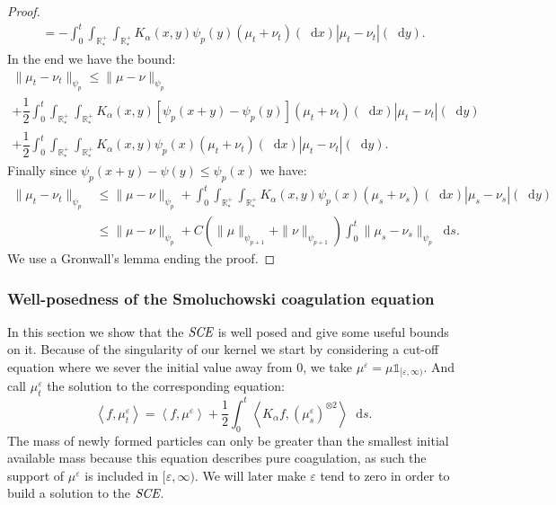 \documentclass[11pt,a4paper]{article}
\newcommand{\RRP}{\mathbb{R}^+_*}
\newcommand{\SCE}{\emph{SCE}}
\newcommand{\brac}[1]{\left\langle#1\right\rangle}
\newcommand{\dd}{\mathop{}\!\mathrm{d}}
\begin{document}
\begin{proof}
\begin{multline*}
        = -\int_0^t \int_{\RRP}\int_{\RRP} K_\alpha(x,y) \psi_p(y)\left(\mu_t + \nu_t\right)(\dd x) \left|\mu_t - \nu_t\right|(\dd y).
    \end{multline*}
    In the end we have the bound:
    \begin{multline*}
        \| \mu_t - \nu_t\|_{\psi_p} \leq \|\mu- \nu\|_{\psi_p} \\
        + \dfrac12\int_0^t \int_{\RRP}\int_{\RRP} K_\alpha(x,y) \left[\psi_p(x+y) - \psi_p(y) \right]\left(\mu_t + \nu_t\right)(\dd x) \left|\mu_t - \nu_t\right|(\dd y) \\
        + \dfrac12\int_0^t \int_{\RRP}\int_{\RRP} K_\alpha(x,y)\psi_p(x)\left(\mu_t + \nu_t\right)(\dd x) \left|\mu_t - \nu_t\right|(\dd y).
    \end{multline*}
    Finally since $\psi_p(x+y) - \psi(y) \leq \psi_p(x)$ we have:
    \begin{align*}
        \| \mu_t - \nu_t\|_{\psi_p} &\leq \|\mu- \nu\|_{\psi_p} + \int_0^t \int_{\RRP}\int_{\RRP} K_\alpha(x,y)\psi_p(x)\left(\mu_s + \nu_s\right)(\dd x) \left|\mu_s - \nu_s\right|(\dd y)\\
        &\leq \|\mu- \nu\|_{\psi_p} + C\left(\|\mu\|_{\psi_{p+1}} + \|\nu\|_{\psi_{p+1}}\right) \int_0^t \|\mu_s - \nu_s \|_{\psi_p}\dd s.
    \end{align*}
    We use a Gronwall's lemma ending the proof.
\end{proof}

\subsubsection{Well-posedness of the Smoluchowski coagulation equation}
In this section we show that the $\SCE$ is well posed and give some useful bounds on it. Because of the singularity of our kernel we start by considering a cut-off equation where we sever the initial value away from $0$, we take $\mu^\varepsilon = \mu\mathds{1}_{[\varepsilon,\infty)}$. And call $\mu^\varepsilon_t$ the solution to the corresponding equation:
\begin{equation}\label{eq:cutoff_SCE}
    \brac{f, \mu^\varepsilon_t} = \brac{f,\mu^\varepsilon} + \dfrac12\int_0^t \brac{K_\alpha f,\left(\mu^\varepsilon_s\right)^{\otimes 2}} \dd s.
\end{equation}
The mass of newly formed particles can only be greater than the smallest initial available mass because this equation describes pure coagulation, as such the support of $\mu^\varepsilon$ is included in $[\varepsilon,\infty)$. We will later make $\varepsilon$ tend to zero in order to build a solution to the $\SCE$.
\end{document}
